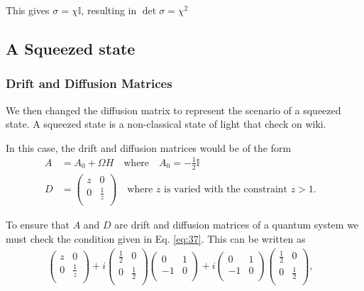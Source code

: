 \documentclass[11pt,a4paper]{article}
\numberwithin{equation}{section}
\begin{document}
	This gives $\sigma = \chi \mathbb{I}$, resulting in $\det \sigma = \chi^2$ 

	\subsection{A Squeezed state}
	\subsubsection{Drift and Diffusion Matrices}
	We then changed the diffusion matrix to represent the scenario of a squeezed state. A squeezed state is a non-classical state of light that \color{blue} check on wiki. \color{black}
	
	In this case, the drift and diffusion matrices would be of the form	
	\begin{align*}
	A &= A_0 + \Omega H \quad\text{where}\quad A_0 = -\frac{1}{2}\mathbb{I}&\\
	D &= \begin{pmatrix}
	z & 0  \\
	0 & \frac{1}{z}\\
	\end{pmatrix} \quad\text{where $z$ is varied with the constraint $z>1$}.&
	\end{align*} 
	
	To ensure that $A$ and $D$ are drift and diffusion matrices of a quantum system we must check the condition given in Eq. \ref{eq:37}. This can be written as
	\begin{align*}
	\begin{pmatrix}
	z & 0  \\
	0 & \frac{1}{z}\\
	\end{pmatrix} + i\begin{pmatrix}
	\frac{1}{2} & 0  \\
	0 & \frac{1}{2} \\
	\end{pmatrix}\begin{pmatrix}
	0 & 1  \\
	-1 & 0 \\
	\end{pmatrix} + i\begin{pmatrix}
	0 & 1  \\
	-1 & 0 \\
	\end{pmatrix}\begin{pmatrix}
	\frac{1}{2} & 0  \\
	0 & \frac{1}{2} \\
	\end{pmatrix},&
	\end{align*}
	
\end{document}
